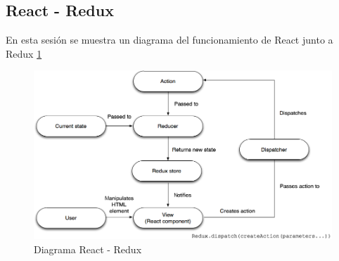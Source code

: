 \subsection {React - Redux}
En esta sesión se muestra un diagrama del funcionamiento de React junto a Redux \ref{fig:react_redux}
\begin{figure}
  \begin{center}
    \includegraphics[width=\textwidth]{imagenes/react_redux.png}
    \caption{Diagrama React - Redux}
    \label{fig:react_redux}
  \end{center}
\end{figure}


  
